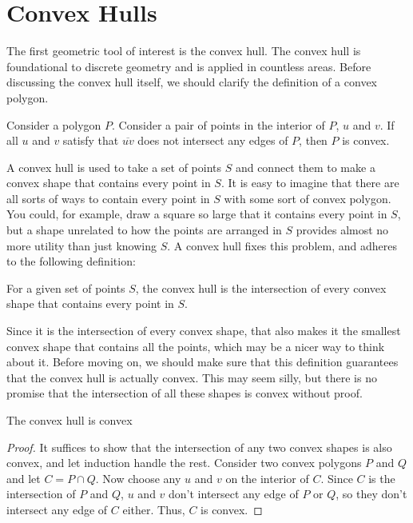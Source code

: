 \section{Convex Hulls}
The first geometric tool of interest is the convex hull.
The convex hull is foundational to discrete geometry and is applied in countless areas.
Before discussing the convex hull itself, we should clarify the definition of a convex polygon.

\begin{definition}
	Consider a polygon $P$. Consider a pair of points in the interior of $P$, $u$ and $v$. If all $u$ and $v$ satisfy that $\overline{uv}$ does not intersect any edges of $P$, then $P$ is convex.
\end{definition}

A convex hull is used to take a set of points $S$ and connect them to make a convex shape that contains every point in $S$.
It is easy to imagine that there are all sorts of ways to contain every point in $S$ with some sort of convex polygon.
You could, for example, draw a square so large that it contains every point in $S$, but a shape unrelated to how the points are arranged in $S$ provides almost no more utility than just knowing $S$.
A convex hull fixes this problem, and adheres to the following definition:

\begin{definition}
	For a given set of points $S$, the convex hull is the intersection of every convex shape that contains every point in $S$.
\end{definition}

Since it is the intersection of every convex shape, that also makes it the smallest convex shape that contains all the points, which may be a nicer way to think about it.
Before moving on, we should make sure that this definition guarantees that the convex hull is actually convex.
This may seem silly, but there is no promise that the intersection of all these shapes is convex without proof.

\begin{theorem}
	The convex hull is convex
\end{theorem}

\begin{proof}
	It suffices to show that the intersection of any two convex shapes is also convex, and let induction handle the rest.
	Consider two convex polygons $P$ and $Q$ and let $C=P\cap Q$.
	Now choose any $u$ and $v$ on the interior of $C$.
	Since $C$ is the intersection of $P$ and $Q$, $u$ and $v$ don't intersect any edge of $P$ or $Q$, so they don't intersect any edge of $C$ either.
	Thus, $C$ is convex.
\end{proof}

